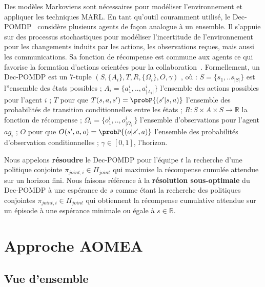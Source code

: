 Des modèles Markoviens sont nécessaires pour modéliser l'environnement et appliquer les techniques MARL. En tant qu'outil couramment utilisé, le Dec-POMDP~\cite{Oliehoek2016} considère plusieurs agents de façon analogue à un ensemble. Il s'appuie sur des processus stochastiques pour modéliser l'incertitude de l'environnement pour les changements induits par les actions, les observations reçues, mais aussi les communications. Sa fonction de récompense est commune aux agents ce qui favorise la formation d'actions orientées pour la collaboration~\cite{Beynier2013}. Formellement, un Dec-POMDP est un 7-tuple $(S,\{A_i\},T,R,\{\Omega_i\},O,\gamma)$ , où : $S = \{s_1, .. s_{|S|}\}$ est l''ensemble des états possibles ; $A_{i} = \{a_{1}^{i},..,a_{|A_{i}|}^{i}\}$ l'ensemble des actions possibles pour l'agent $i$ ; $T$ pour que $T(s,a,s') = \probP{(s'|s,a)}$ l'ensemble des probabilités de transition conditionnelles entre les états ; $R : S \times A \times S \rightarrow \mathbb{R}$ la fonction de récompense ; $\Omega_{i} = \{o_{1}^{i},..,o_{|\Omega_{i}|}^{i}\}$  l'ensemble d'observations pour l'agent $ag_i$ ; $O$ pour que $O(s',a,o) = \probP{(o|s',a)}$  l'ensemble des probabilités d'observation conditionnelles ; $\gamma \in [0,1]$, l'horizon.

Nous appelons \textbf{résoudre} le Dec-POMDP pour l'équipe $t$ la recherche d'une politique conjointe $\pi_{joint,i} \in \Pi_{joint}$ qui maximise la récompense cumulée attendue sur un horizon fini.
Nous faisons référence à la \textbf{résolution sous-optimale} du Dec-POMDP à une espérance de $s$ comme étant la recherche des politiques conjointes $\pi_{joint,i} \in \Pi_{joint}$ qui obtiennent la récompense cumulative attendue sur un épisode à une espérance minimale ou égale à $s \in \mathbb{R}$.



\section{Approche AOMEA}



\subsection{Vue d'ensemble}

